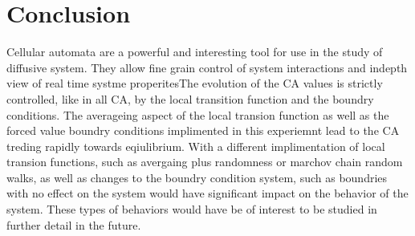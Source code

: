 \documentclass[11pt,twocolumn]{article}
\begin{document}
\vspace{5mm}

\section{Conclusion}
Cellular automata are a powerful and interesting tool for use in the study of diffusive system. They allow fine grain control of system interactions and indepth view of real time systme properites\cite{weimar}The evolution of the CA values is strictly controlled, like in all CA, by the local transition function and the boundry conditions\cite{wolfram94}. The averageing aspect of the local transion function as well as the forced value boundry conditions implimented in this experiemnt lead to the CA treding rapidly towards eqiulibrium. 
With a different implimentation of local transion functions, such as avergaing plus randomness\cite{yang01} or marchov chain random walks, as well as 
changes to the boundry condition system, such as boundries with no effect on the system would have significant impact on the behavior of the system. 
These types of behaviors would have be of interest to be studied in further detail in the future.
\end{document}
